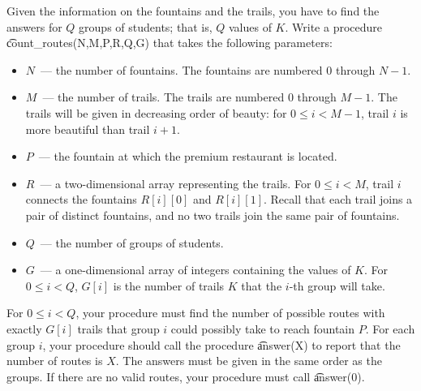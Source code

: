 Given the information on the fountains and the trails, you have to find the answers for $Q$ groups of students; that is, $Q$ values of $K$.
Write a procedure \t{count\_routes(N,M,P,R,Q,G)} that takes the following parameters:
\begin{itemize}
\item $N$~--- the number of fountains. The fountains are numbered $0$ through $N-1$.
\item $M$~--- the number of trails. The trails are numbered $0$ through $M-1$. The trails will be given in decreasing order of beauty: for $0 \le i < M-1$, trail $i$ is more beautiful than trail $i+1$.
\item $P$~--- the fountain at which the premium restaurant is located.
\item $R$~--- a two-dimensional array representing the trails. For $0 \le i < M$, trail $i$ connects the fountains $R[i][0]$ and $R[i][1]$. Recall that each trail joins a pair of distinct fountains, and no two trails join the same pair of fountains.
\item $Q$~--- the number of groups of students.
\item $G$~--- a one-dimensional array of integers containing the values of $K$. For $0 \le i < Q$, $G[i]$ is the number of trails $K$ that the $i$-th group will take.
\end{itemize}

For $0 \le i < Q$, your procedure must find the number of possible routes with exactly $G[i]$ trails that group $i$ could possibly take to reach fountain $P$. For each group $i$, your procedure should call the procedure \t{answer(X)} to report that the number of routes is $X$. The answers must be given in the same order as the groups. If there are no valid routes, your procedure must call \t{answer(0)}.